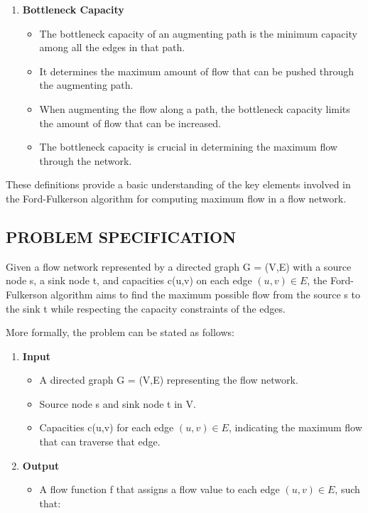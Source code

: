 \documentclass{article}
\begin{document}
{\begin{enumerate}
    \item \textbf{Bottleneck Capacity}
    \begin{itemize}
        \item The bottleneck capacity of an augmenting path is the minimum capacity among all the edges in that path.
        \item It determines the maximum amount of flow that can be pushed through the augmenting path.
        \item When augmenting the flow along a path, the bottleneck capacity limits the amount of flow that can be increased.
        \item The bottleneck capacity is crucial in determining the maximum flow through the network.
    \end{itemize}
    \vspace{0.6cm}
    \end{enumerate}
    
    \vspace{1cm}
    
These definitions provide a basic understanding of the key elements involved in the Ford-Fulkerson algorithm for computing maximum flow in a flow network.
\pagebreak
\vspace{1cm}
\subsection{\textbf{PROBLEM SPECIFICATION}}
{\fontsize{15}{15}\selectfont
Given a flow network represented by a directed graph G = (V,E) with a source node s, a sink node t, and capacities c(u,v) on each edge $(u,v) \in E$, the Ford-Fulkerson algorithm aims to find the maximum possible flow from the source s to the sink t while respecting the capacity constraints of the edges.

\vspace{0.6cm}
More formally, the problem can be stated as follows:

\vspace{0.3cm}
\begin{enumerate}
    \item \textbf{Input}
    \begin{itemize}
        \item A directed graph G = (V,E) representing the flow network.
        \item Source node s and sink node t in V.
        \item Capacities c(u,v) for each edge $(u,v) \in E$, indicating the maximum flow that can traverse that edge.
    \end{itemize}
    \item \textbf{Output} 
    \begin{itemize}
        \item A flow function f that assigns a flow value to each edge $(u,v) \in E$, such that:
   

\end{itemize}
\end{enumerate}}}
\end{document}
